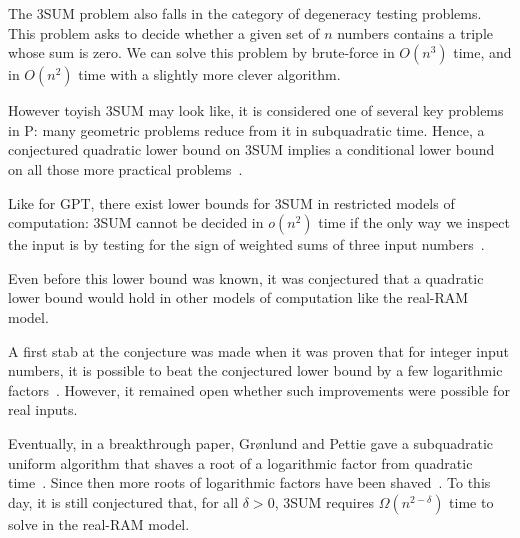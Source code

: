 The 3SUM problem also falls in the category of degeneracy testing problems.
This problem asks to decide whether a given set of \(n\) numbers contains a triple
whose sum is zero. We can solve this problem by brute-force in \(O(n^3)\) time,
and in \(O(n^2)\) time with a slightly more clever algorithm.

However toyish 3SUM may look like, it is considered one of several key problems
in P: many geometric problems reduce from it in subquadratic time. Hence, a
conjectured quadratic lower bound on 3SUM implies a conditional lower bound on
all those more practical problems~\cite{GO95}.

Like for GPT, there exist lower bounds for 3SUM in restricted models of
computation: 3SUM cannot be decided in \(o(n^2)\) time if the only way we
inspect the input is by testing for the sign of weighted sums of three
input numbers~\cite{Er99a}.

Even before this lower bound was known, it was conjectured that a quadratic lower
bound would hold in other models of computation like the real-RAM model.

A first stab at the conjecture was made when it was proven that for integer
input numbers, it is possible to beat the conjectured lower bound by a few
logarithmic factors~\cite{BDP08}.
However, it remained open whether such improvements were
possible for real inputs.

Eventually, in a breakthrough paper, Gr\o nlund and Pettie gave a subquadratic
uniform algorithm that shaves a root of a logarithmic factor from quadratic
time~\cite{GP18}.
%
Since then more roots of logarithmic factors have been shaved~\cite{Fr15,GS15}.
%
To this day, it is still conjectured that, for all \(\delta > 0\), 3SUM
requires \(\Omega(n^{2 - \delta})\) time to solve in the real-RAM model.
